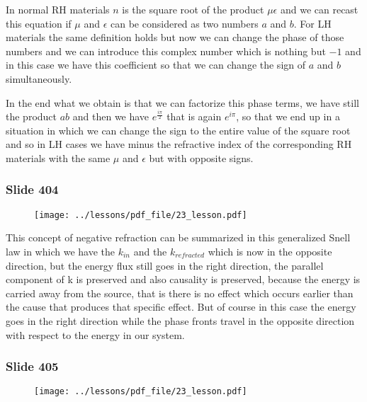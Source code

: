 \documentclass[../main/main.tex]{subfiles}
\begin{document}
In normal RH materials $n$ is the square root of the product $\mu \epsilon$ and we can recast this equation if $\mu$ and $\epsilon$ can be considered as two numbers $a$ and $b$. For LH materials the same definition holds but now we can change the phase of those  numbers and we can introduce this complex number which is nothing but $-1$ and in this case we have this coefficient so that we can change the sign of $a$ and $b$ simultaneously. 

In the end what we obtain is that we can factorize this phase terms, we have still the product $ab$ and then we have $e^{\frac{i \pi}{2}}$ that is again $e^{i \pi}$, so that we end up in a situation in which we can change the sign to the entire value of the square root and so in LH cases we have minus the refractive index of the corresponding RH materials with the same $\mu$ and $\epsilon$ but with opposite signs.

\newpage

\subsubsection{Slide 404}

\begin{figure}[h!]
\centering
\texttt{[image: ../lessons/pdf\_file/23\_lesson.pdf]}
\end{figure}

This concept of negative refraction can be summarized in this generalized Snell law in which we have the $k_{in}$ and the $k_{refracted}$ which is now in the opposite direction, but the energy flux still goes in the right direction, the parallel component of k is preserved and also causality is preserved, because the energy is carried away from the source, that is there is no effect which occurs earlier than the cause that produces that specific effect. But of course in this case the energy goes in the right direction while the phase fronts travel in the opposite direction with respect to the energy in our system.

\newpage

\subsubsection{Slide 405}

\begin{figure}[h!]
\centering
\texttt{[image: ../lessons/pdf\_file/23\_lesson.pdf]}
\end{figure}
\end{document}
